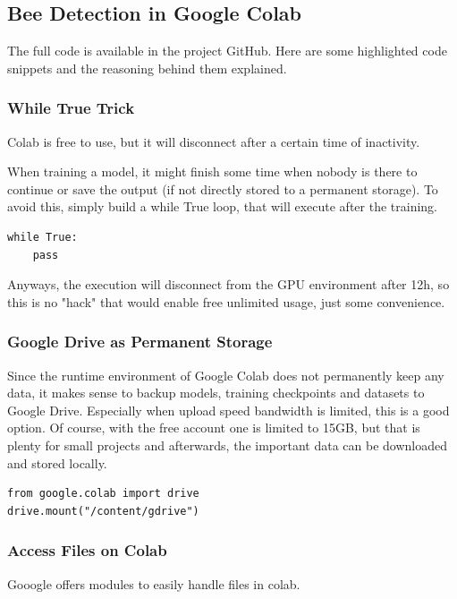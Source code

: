 \documentclass[a4paper,titlepage]{article}
\begin{document}
\subsection{Bee Detection in Google Colab}

The full code is available in the project GitHub.
Here are some highlighted code snippets and the reasoning behind them explained.

\subsubsection{While True Trick}

Colab is free to use, but it will disconnect after a certain time of inactivity.

When training a model, it might finish some time when nobody is there to continue or save the output (if not directly stored to a permanent storage).
To avoid this, simply build a while True loop, that will execute after the training.

\begin{lstlisting}
while True:
    pass
\end{lstlisting}

Anyways, the execution will disconnect from the GPU environment after 12h, so this is no "hack" that would enable free unlimited usage, just some convenience.

\subsubsection{Google Drive as Permanent Storage}

Since the runtime environment of Google Colab does not permanently keep any data, it makes sense to backup models, training checkpoints and datasets to Google Drive.
Especially when upload speed bandwidth is limited, this is a good option.
Of course, with the free account one is limited to 15GB, but that is plenty for small projects and afterwards, the important data can be downloaded and stored locally.

\begin{lstlisting}
from google.colab import drive
drive.mount("/content/gdrive")
\end{lstlisting}

\subsubsection{Access Files on Colab}

Gooogle offers modules to easily handle files in colab.
\end{document}
